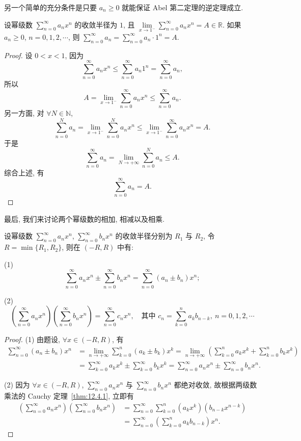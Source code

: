 另一个简单的充分条件是只要 $a_{n}\geqslant0$ 就能保证 Abel 第二定理的逆定理成立.

\begin{theorem}\label{thm:14.1.7}
设幂级数 $\sum_{n=0}^{\infty}a_{n}x^{n}$ 的收敛半径为 $1$, 且 $\lim\limits_{x\to1^{-}}\sum_{n=0}^{\infty}a_{n}x^{n}=A\in\mathbb{R}$. 如果 $a_{n}\geqslant0$, $n=0,1,2,\cdots$, 则 $\sum_{n=0}^{\infty}a_{n}=\sum_{n=0}^{\infty}a_{n}\cdot1^{n}=A$.
\end{theorem}

\begin{proof}
设 $0<x<1$, 因为
\[
  \sum_{n=0}^{\infty}a_{n}x^{n}\leqslant\sum_{n=0}^{\infty}a_{n}1^{n}=\sum_{n=0}^{\infty}a_{n},
\]
所以
\[
  A=\lim_{x\to1^{-}}\sum_{n=0}^{\infty}a_{n}x^{n}\leqslant\sum_{n=0}^{\infty}a_{n}.
\]
另一方面, 对 $\forall N\in\mathbb{N}$,
\[
  \sum_{n=0}^{N}a_{n}=\lim_{x\to1^{-}}\sum_{n=0}^{N}a_{n}x^{n}\leqslant\lim_{x\to1^{-}}\sum_{n=0}^{\infty}a_{n}x^{n}=A.
\]
于是
\[
  \sum_{n=0}^{\infty}a_{n}=\lim_{N\to+\infty}\sum_{n=0}^{N}a_{n}\leqslant A.
\]
综合上述, 有
\[
  \sum_{n=0}^{\infty}a_{n}=A.
\]
\end{proof}

最后, 我们来讨论两个幂级数的相加, 相减以及相乘.

\begin{theorem}\label{thm:14.1.8}
设幂级数 $\sum_{n=0}^{\infty}a_{n}x^{n}$, $\sum_{n=0}^{\infty}b_{n}x^{n}$ 的收敛半径分别为 $R_{1}$ 与 $R_{2}$, 令 $R=\min\{R_{1},R_{2}\}$, 则在 $(-R,R)$ 中有:

(1)
\[
  \sum_{n=0}^{\infty}a_{n}x^{n}\pm\sum_{n=0}^{\infty}b_{n}x^{n}=\sum_{n=0}^{\infty}(a_{n}\pm b_{n})x^{n};
\]

(2)
\[
  \left(\sum_{n=0}^{\infty}a_{n}x^{n}\right)\left(\sum_{n=0}^{\infty}b_{n}x^{n}\right)=\sum_{n=0}^{\infty}c_{n}x^{n},\quad \text{其中 }c_{n}=\sum_{k=0}^{n}a_{k}b_{n-k},\ n=0,1,2,\cdots
\]
\end{theorem}

\begin{proof}
(1) 由题设, $\forall x\in(-R,R)$, 有
\[
  \begin{aligned}
    \sum_{n=0}^{\infty}(a_{n}\pm b_{n})x^{n}&=\lim_{n\to+\infty}\sum_{k=0}^{n}(a_{k}\pm b_{k})x^{k}=\lim_{n\to+\infty}\left(\sum_{k=0}^{n}a_{k}x^{k}+\sum_{k=0}^{n}b_{k}x^{k}\right)\\
    &=\sum_{k=0}^{\infty}a_{k}x^{k}\pm\sum_{k=0}^{\infty}b_{k}x^{k}=\sum_{n=0}^{\infty}a_{n}x^{n}\pm\sum_{n=0}^{\infty}b_{n}x^{n}.
  \end{aligned}
\]

(2) 因为 $\forall x\in(-R,R)$, $\sum_{n=0}^{\infty}a_{n}x^{n}$ 与 $\sum_{n=0}^{\infty}b_{n}x^{n}$ 都绝对收敛, 故根据两级数乘法的 Cauchy 定理~\ref{thm:12.4.1}, 立即有
\[
  \begin{aligned}
    \left(\sum_{n=0}^{\infty}a_{n}x^{n}\right)\left(\sum_{n=0}^{\infty}b_{n}x^{n}\right)&=\sum_{n=0}^{\infty}\sum_{k=0}^{n}(a_{k}x^{k})(b_{n-k}x^{n-k})\\
    &=\sum_{n=0}^{\infty}\left(\sum_{k=0}^{n}a_{k}b_{n-k}\right)x^{n}.
  \end{aligned}
\]
\end{proof}

